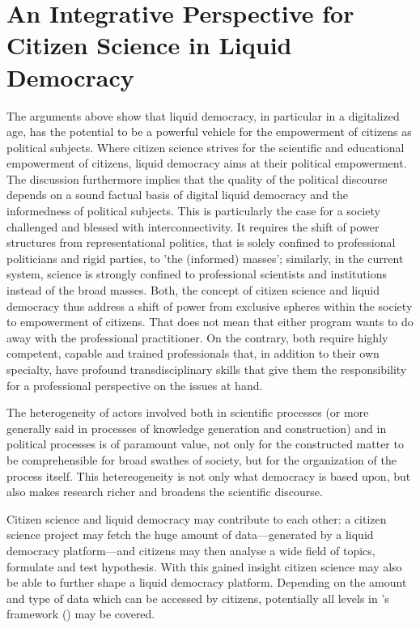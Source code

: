 \section{An Integrative Perspective for Citizen Science in Liquid Democracy}
\label{sec:Integration_CSLD}
The arguments above show that liquid democracy, in particular in a digitalized age, has the potential to be a powerful vehicle for the empowerment of citizens as political subjects. Where citizen science strives for the scientific and educational empowerment of citizens, liquid democracy aims at their political empowerment. The discussion furthermore implies that the quality of the political discourse depends on a sound factual basis of digital liquid democracy and the informedness of political subjects. This is particularly the case for a society challenged and blessed with interconnectivity. It requires the shift of power structures from representational politics, that is solely confined to professional politicians and rigid parties, to 'the (informed) masses'; similarly, in the current system, science is strongly confined to professional scientists and institutions instead of the broad masses. Both, the concept of citizen science and liquid democracy thus address a shift of power from exclusive spheres within the society to empowerment of citizens. That does not mean that either program wants to do away with the professional practitioner. On the contrary, both require highly competent, capable and trained professionals that, in addition to their own specialty, have profound transdisciplinary skills that give them the responsibility for a professional perspective on the issues at hand.


The heterogeneity of actors involved both in scientific processes (or more generally said in processes of knowledge generation and construction) and in political processes is of paramount value, not only for the constructed matter to be comprehensible for broad swathes of society, but for the organization of the process itself. This hetereogeneity is not only what democracy is based upon, but also makes research richer and broadens the scientific discourse.


Citizen science and liquid democracy may contribute to each other: a citizen science project may fetch the huge amount of data---generated by a liquid democracy platform---and citizens may then analyse a wide field of topics, formulate and test hypothesis. With this gained insight citizen science may also be able to further shape a liquid democracy platform. Depending on the amount and type of data which can be accessed by citizens, potentially all levels in \citeauthor{Hakalay2014}’s framework (\citeyear{Hakalay2014}) may be covered.

